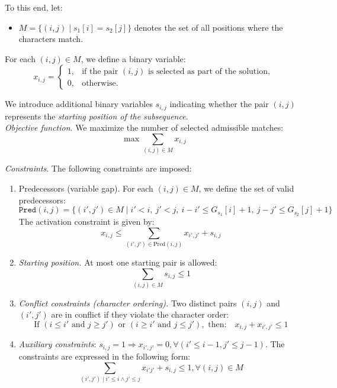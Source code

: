 \documentclass[runningheads]{llncs}
\begin{document}
To this end, let:
\begin{itemize}
	\item $M = \{ (i,j) \mid s_1[i] = s_2[j] \}$ denotes the set of all positions where the characters match.
\end{itemize}

For each $(i,j) \in M$, we define a binary variable:
\[
x_{i,j} =
\begin{cases}
	1, & \textrm{if the pair } (i,j) \textrm{ is selected as part of the solution}, \\
	0, & \textrm{otherwise}.
\end{cases}
\]

We introduce additional binary variables $s_{i,j}$ indicating whether the pair $(i,j)$ represents
the \emph{starting position of the subsequence}. \\

\textit{Objective function}. We maximize the number of selected admissible matches:
\[
\max \sum_{(i,j) \in M} x_{i,j}
\]

\textit{Constraints}. The following constraints are imposed:

\begin{enumerate}
	\item \textrm{Predecessors (variable gap).}  
	For each $(i,j) \in M$, we define the set of valid predecessors:
	\[
	\texttt{Pred}(i,j) =
	\{ (i',j') \in M \mid i' < i,\ j' < j,\ i - i' \leq G_{s_1}[i] + 1,\ j - j' \leq G_{s_2}[j] + 1 \}
	\]
	The activation constraint is given by:
	\[
	x_{i,j} \leq \sum_{(i',j') \in \textrm{Pred}(i,j)} x_{i',j'} + s_{i,j}
	\]
	
	\item \textit{Starting position.}  
	At most one starting pair is allowed:
	\[
	\sum_{(i,j) \in M} s_{i,j} \leq 1
	\]
	
	\item \textit{Conflict constraints (character ordering).}  
	Two distinct pairs $(i,j)$ and $(i',j')$ are in conflict if they violate the character order:
	\[
	\textrm{If } (i \leq i' \textrm{ and } j \geq j') \textrm{ or }
	(i \geq i' \textrm{ and } j \leq j'), \textrm{ then:}
	\quad x_{i,j} + x_{i',j'} \leq 1
	\]
	\item \textit{Auxiliary constraints}: $s_{i, j}=1 \Rightarrow x_{i',j'}=0, \forall (i' \leq i-1, j' \leq j-1)$. The constraints are expressed in the following form: 
	$$ \sum_{(i', j') \mid i'\leq i \wedge j'\leq j} x_{i' j'} + s_{i, j} \leq 1, \forall (i, j) \in M$$
\end{enumerate}
\end{document}
